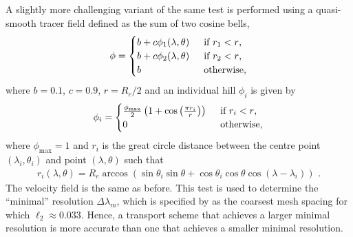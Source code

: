 A slightly more challenging variant of the same test is performed using a quasi-smooth tracer field defined as the sum of two cosine bells,
\begin{align}
	\phi =
	\begin{cases}
		b + c \phi_1(\lambda, \theta) & \enskip \text{if $r_1 < r$,} \\
		b + c \phi_2(\lambda, \theta) & \enskip \text{if $r_2 < r$,} \\
		b			      & \enskip \text{otherwise,} \\
	\end{cases}
\end{align}
where $b = \num{0.1}$, $c = \num{0.9}$, $r = R_e / 2$ and an individual hill $\phi_i$ is given by
\begin{align}
	\phi_i =
	\begin{cases}
		\frac{\phi_\mathrm{max}}{2} \left( 1 + \cos \left( \frac{\pi r_i}{r} \right) \right) & \enskip \text{if $r_i < r$,} \\
		0 & \enskip \text{otherwise,}
	\end{cases}
\end{align}
where $\phi_\mathrm{max} = 1$ and $r_i$ is the great circle distance between the centre point $\left( \lambda_i, \theta_i\right)$ and point $\left( \lambda, \theta \right)$ such that
\begin{align}
	r_i(\lambda, \theta) = R_e \arccos\left( \sin \theta_i \sin \theta + \cos \theta_i \cos \theta \cos \left( \lambda - \lambda_i \right) \right) \text{ .}
\end{align}
The velocity field is the same as before.  This test is used to determine the ``minimal'' resolution $\Delta \lambda_m$, which is specified by \citet{lauritzen2012} as the coarsest mesh spacing for which $\ell_2 \approx 0.033$.
Hence, a transport scheme that achieves a larger minimal resolution is more accurate than one that achieves a smaller minimal resolution.

